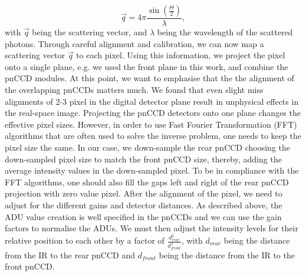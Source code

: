 \begin{equation}
\vec{q} = 4 \pi \frac{\sin\left(\frac{\Theta}{2}\right)}{\lambda},
\label{eqn:q-vector}
\end{equation}
with $\vec{q}$ being the scattering vector, and $\lambda$ being the wavelength of the scattered photons. Through careful alignment and calibration, we can now map a scattering vector $\vec{q}$ to each pixel. Using this information, we project the pixel onto a single plane, e.g. we used the front plane in this work, and combine the pnCCD modules. At this point, we want to emphasise that the the alignment of the overlapping pnCCDs matters much. We found that even slight miss alignments of 2-3 pixel in the digital detector plane result in unphysical effects in the real-space image. Projecting the pnCCD detectors onto one plane changes the effective pixel sizes. However, in order to use Fast Fourier Transformation (FFT) algorithms that are often used to solve the inverse problem, one needs to keep the pixel size the same. In our case, we down-sample the rear pnCCD choosing the down-sampled pixel size to match the front pnCCD size, thereby, adding the average intensity values in the down-sampled pixel. To be in compliance with the FFT algorithms, one should also fill the gaps left and right of the rear pnCCD projection with zero value pixel. After the alignment of the pixel, we need to adjust for the different gains and detector distances. As described above, the ADU value creation is well specified in the pnCCDs and we can use the gain factors to normalise the ADUs. We must then adjust the intensity levels for their relative position to each other by a factor of $\frac{d_{rear}^{2}}{d_{front}^{2}}$, with $d_{rear}$ being the distance from the IR to the rear pnCCD and $d_{front}$ being the distance from the IR to the front pnCCD.\\
